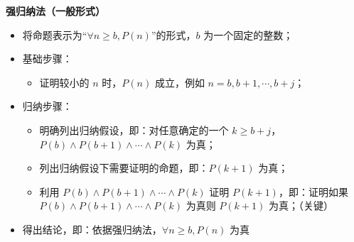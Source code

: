 \documentclass[UTF8]{report}
\theoremstyle{MyLineTheoremStyle} %
\theoremstyle{MyBlockTheoremStyle} %
\theoremstyle{MySubsubsectionStyle} %
\begin{document}
        \textbf{强归纳法（一般形式）}
        \begin{itemize}
            \item 将命题表示为“$\forall n \geq b, P(n)$”的形式，$b$ 为一个固定的整数；
            \item 基础步骤：
            \begin{itemize}
                \item 证明较小的 $n$ 时，$P(n)$ 成立，例如 $n = b, b+1, \cdots, b+j$；
            \end{itemize}
            \item 归纳步骤：
            \begin{itemize}
                \item 明确列出归纳假设，即：对任意确定的一个 $k \geq b+j$，$P(b) \land P(b+1) \land \cdots \land P(k)$ 为真；
                \item 列出归纳假设下需要证明的命题，即：$P(k+1)$ 为真；
                \item 利用 $P(b) \land P(b+1) \land \cdots \land P(k)$ 证明 $P(k+1)$，即：证明如果 $P(b) \land P(b+1) \land \cdots \land P(k)$ 为真则 $P(k+1)$ 为真；（关键）
            \end{itemize}
            \item 得出结论，即：依据强归纳法，$\forall n \geq b, P(n)$ 为真
        \end{itemize}
        
\end{document}
